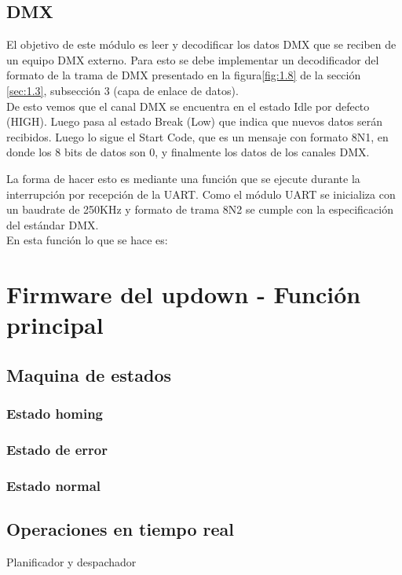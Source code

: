 \subsection{DMX}

El objetivo de este módulo es leer y decodificar los datos DMX que se reciben de un equipo DMX externo. Para esto se debe implementar un decodificador del formato de la trama de DMX presentado en la figura\ref{fig:1.8} de la sección \ref{sec:1.3}, subsección 3 (capa de enlace de datos).\\
De esto vemos que el canal DMX se encuentra en el estado Idle por defecto (HIGH). Luego pasa al estado Break (Low) que indica que nuevos datos serán recibidos. Luego lo sigue el Start Code, que es un mensaje con formato 8N1, en donde los 8 bits de datos son 0, y finalmente los datos de los canales DMX.

La forma de hacer esto es mediante una función que se ejecute durante la interrupción por recepción de la UART. Como el módulo UART se inicializa con un baudrate de 250KHz y formato de trama 8N2 se cumple con la especificación del estándar DMX. \\
En esta función lo que se hace es:
 


\section{Firmware del updown - Función principal} \label{sec:\thesection}

\subsection{Maquina de estados}

\subsubsection{Estado homing}

\subsubsection{Estado de error}

\subsubsection{Estado normal}

\subsection{Operaciones en tiempo real}
Planificador y despachador




